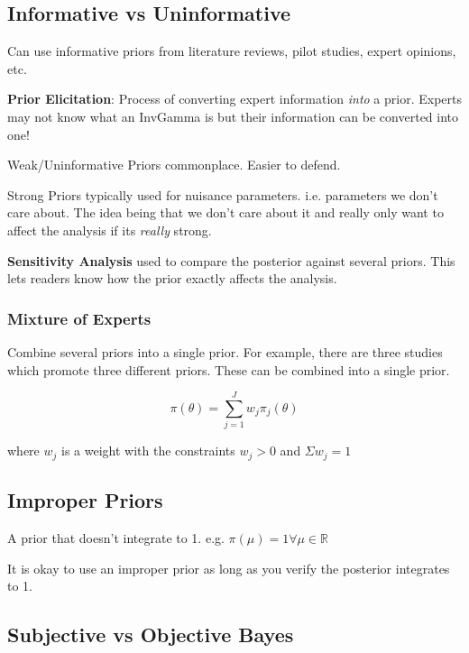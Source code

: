 \documentclass[11pt]{article}
\begin{document}
\subsection{Informative vs Uninformative}
\label{sec:org66424d7}

Can use informative priors from literature reviews, pilot studies, expert
opinions, etc.

\textbf{Prior Elicitation}: Process of converting expert information \emph{into} a prior.
 Experts may not know what an InvGamma is but their information can be converted
 into one!

Weak/Uninformative Priors commonplace. Easier to defend.

Strong Priors typically used for nuisance parameters. i.e. parameters we don't
care about. The idea being that we don't care about it and really only want to
affect the analysis if its \emph{really} strong.


\textbf{Sensitivity Analysis} used to compare the posterior against several priors.
 This lets readers know how the prior exactly affects the analysis.

\subsubsection{Mixture of Experts}
\label{sec:org937f62b}

Combine several priors into a single prior. For example, there are three studies
which promote three different priors. These can be combined into a single prior.

$$
\pi(\theta) = \sum_{j = 1}^{J} w_j \pi_j(\theta)
$$

where \(w_j\) is a weight with the constraints \(w_j > 0\) and \(\Sigma w_j = 1\)

\subsection{Improper Priors}
\label{sec:org07b711f}

A prior that doesn't integrate to 1. e.g. \(\pi(\mu) = 1 \forall \mu \in \mathbb{R}\)

It is okay to use an improper prior as long as you verify the posterior integrates to 1.

\subsection{Subjective vs Objective Bayes}
\label{sec:org4c116c3}
\end{document}
